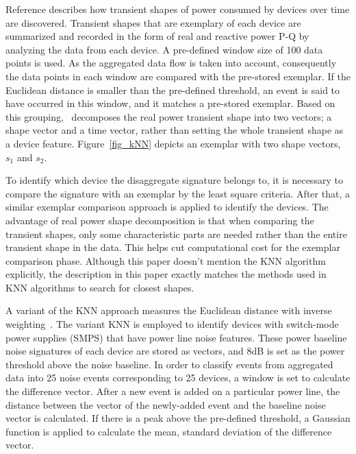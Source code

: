 Reference \cite{shaw2000PhdThesis} describes how transient shapes of power consumed by devices over time are discovered.
Transient shapes that are exemplary of each device are summarized and recorded 
in the form of real and reactive power P-Q by analyzing the data from each device. 
A pre-defined window size of 100 data points is used.
As the aggregated data flow is taken into account, consequently 
the data points in each window are compared with 
the pre-stored exemplar. 
If the Euclidean distance is smaller than the pre-defined threshold, 
an event is said to have occurred in this window, and 
it matches a pre-stored exemplar. 
Based on this grouping,~\cite{shaw2008nonintrusive} decomposes the 
real power transient shape into two vectors; a shape vector and a time vector, 
rather than setting the whole transient shape as a device feature. 
Figure~\ref{fig_kNN} depicts an exemplar
with two shape vectors, $s_1$ and $s_2$.

To identify which device the disaggregate signature belongs to,
it is necessary to compare the signature with an exemplar
by the least square criteria.
After that, a similar exemplar comparison approach is applied to identify the devices. 
The advantage of real power shape decomposition is that 
 when comparing the transient shapes,
only some characteristic parts are needed
rather than the entire transient shape in the data.
This helps cut computational cost for the exemplar comparison phase. 
Although this paper doesn't mention the KNN algorithm explicitly,
the description in this paper exactly matches the methods used in KNN algorithms to search for closest shapes.

A variant of the KNN approach measures the Euclidean distance with inverse weighting~\cite{gupta2010electrisense}. 
The variant KNN is employed to identify devices
with switch-mode power supplies (SMPS) that have power line noise features. 
These power baseline noise signatures of each device are stored as vectors, 
and 8dB is set as the power threshold above the noise baseline.
In order to classify events from aggregated data into 25 noise events corresponding to 
25 devices, a window is set to calculate the difference vector. 
After a new event is added on a particular power line,
the distance between the vector of the newly-added event and 
the baseline noise vector is calculated. 
If there is a peak above the pre-defined threshold, 
a Gaussian function is applied to calculate 
the mean, standard deviation of the difference vector. 

